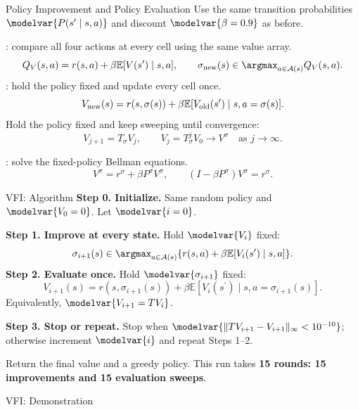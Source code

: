 \begin{frame}{Policy Improvement and Policy Evaluation}
\small
Use the same transition probabilities \(\modelvar{P(s^{\prime}\mid s,a)}\) and discount \(\modelvar{\beta=0.9}\) as before.
\par\medskip
{}: compare all four actions at every cell using the same value array.
\[Q_V(s,a)=r(s,a)+\beta\mathbb E[V(s^{\prime})\mid s,a],\qquad
\sigma_{\rm new}(s)\in\argmax_{a\in\mathcal A(s)} Q_V(s,a).\]
: hold the policy fixed and update every cell once.
\[V_{\rm new}(s)=r(s,\sigma(s))+\beta\mathbb E[V_{\rm old}(s^{\prime})\mid s,a=\sigma(s)].\]
Hold the policy fixed and keep sweeping until convergence:
\[V_{j+1}=T_\sigma V_j,\qquad V_j=T_\sigma^j V_0\longrightarrow V^\sigma
\quad\text{as }j\to\infty.\]
\par\medskip
{}: solve the fixed-policy Bellman equations.
\[V^\sigma=r^\sigma+\beta P^\sigma V^\sigma,
\qquad (I-\beta P^\sigma)V^\sigma=r^\sigma.\]
\end{frame}
\begin{frame}{VFI: Algorithm}
\small
\textbf{Step 0. Initialize.} Same random policy and \(\modelvar{V_0=0}\). Let \(\modelvar{i=0}\).
\par\medskip
\textbf{Step 1. Improve at every state.} Hold \(\modelvar{V_i}\) fixed:
\[\sigma_{i+1}(s)\in\argmax_{a\in\mathcal A(s)}\{r(s,a)+\beta\mathbb E[V_i(s^{\prime})\mid s,a]\}.\]
\textbf{Step 2. Evaluate once.} Hold \(\modelvar{\sigma_{i+1}}\) fixed:
\[V_{i+1}(s)=r(s,\sigma_{i+1}(s))+\beta\mathbb E[V_i(s^{\prime})\mid s,a=\sigma_{i+1}(s)].\]
Equivalently, \(\modelvar{V_{i+1}=TV_i}\).\par\medskip
\textbf{Step 3. Stop or repeat.} Stop when \(\modelvar{\|TV_{i+1}-V_{i+1}\|_\infty<10^{-10}}\); otherwise increment \(\modelvar{i}\) and repeat Steps 1--2.
\par\medskip Return the final value and a greedy policy. This run takes \textbf{15 rounds: 15 improvements and 15 evaluation sweeps}.
\end{frame}
\begin{frame}{VFI: Demonstration}
\centering
{}
\par{}
\end{frame}
